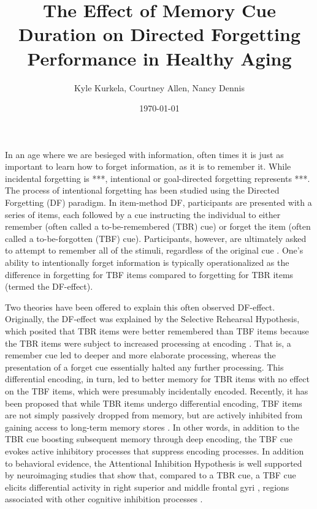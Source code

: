 \documentclass[man]{apa6}
\title{The Effect of Memory Cue Duration on
Directed Forgetting Performance in Healthy Aging}
\author{Kyle Kurkela, Courtney Allen, Nancy Dennis}
\affiliation{Pennsylvania State University}
\date{\today}
\begin{document}
\maketitle


In an age where we are besieged with information, often times it is just as important to learn how to forget information, as it is to remember it. While incidental forgetting is ***, intentional or goal-directed forgetting represents ***. The process of intentional forgetting has been studied using the Directed Forgetting (DF) paradigm. In item-method DF, participants are presented with a series of items, each followed by a cue instructing the individual to either remember (often called a to-be-remembered (TBR) cue) or forget the item (often called a to-be-forgotten (TBF) cue). Participants, however, are ultimately asked to attempt to remember all of the stimuli, regardless of the original cue \parencite{bjork1970,bjork1972,bjork.woordward1973,basden1996}. One’s ability to intentionally forget information is typically operationalized as the difference in forgetting for TBF items compared to forgetting for TBR items (termed the DF-effect).

Two theories have been offered to explain this often observed DF-effect. Originally, the DF-effect was explained by the Selective Rehearsal Hypothesis, which posited that TBR items were better remembered than TBF items because the TBR items were subject to increased processing at encoding \parencite{bjork1970,paller1990,basden.badsen.Gargano1993}. That is, a remember cue led to deeper and more elaborate processing, whereas the presentation of a forget cue essentially halted any further processing. This differential encoding, in turn, led to better memory for TBR items with no effect on the TBF items, which were presumably incidentally encoded. Recently, it has been proposed that while TBR items undergo differential encoding, TBF items are not simply passively dropped from memory, but are actively inhibited from gaining access to long-term memory stores \parencite{fawcett.taylor2008,zachs.hasher1994,zacks.radvansky.hasher1996}. In other words, in addition to the TBR cue boosting subsequent memory through deep encoding, the TBF cue evokes active inhibitory processes that suppress encoding processes. In addition to behavioral evidence, the Attentional Inhibition Hypothesis is well supported by neuroimaging studies that show that, compared to a TBR cue, a TBF cue elicits differential activity in right superior and middle frontal gyri \parencite{ullsperger.mecklinger.muller2000,paz.menor.jimenez2004,wylie.foxe.taylor2008,rizio.dennis2013}, regions associated with other cognitive inhibition processes \parencite{anderson.et.al.2004,depue.curran.banich2007,benoit.anderson2012,anderson.huddleston2012,levy.anderson2012}.
\end{document}

